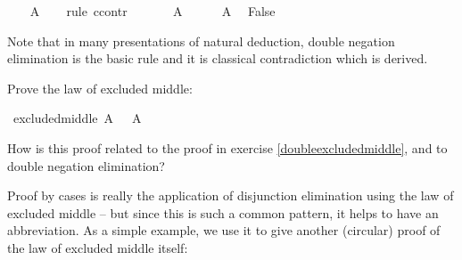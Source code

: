 \begin{isabellebody}
\ \ \isamarkupfalse%
\ {\isachardoublequoteopen}A{\isachardoublequoteclose}\isanewline
\ \ \isamarkupfalse%
\ {\isacharparenleft}rule\ ccontr{\isacharparenright}\isanewline
\ \ \ \ \isamarkupfalse%
\ {\isachardoublequoteopen}{\isasymnot}\ A{\isachardoublequoteclose}\isanewline
\ \ \ \ \isamarkupfalse%
\ {\isacharbackquoteopen}{\isasymnot}{\isasymnot}A{\isacharbackquoteclose}\ \isamarkupfalse%
\ {\isachardoublequoteopen}False{\isachardoublequoteclose}\isacommand{{\isachardot}{\isachardot}}\isamarkupfalse%
\isanewline
\ \ \isamarkupfalse%
\isanewline
{}\isamarkupfalse%
%
\endisatagproof
{\isafoldproof}%
%
\isadelimproof
%
\endisadelimproof
%
\begin{isamarkuptext}%
Note that in many presentations of natural deduction, double negation elimination is the basic
rule and it is classical contradiction which is derived.%
\end{isamarkuptext}\isamarkuptrue%
%
\begin{isamarkuptext}%
\begin{Exercise}[title = The Law of Excluded Middle]\label{excludedmiddle} 
Prove the law of excluded middle: \end{Exercise}%
\end{isamarkuptext}\isamarkuptrue%
\isamarkupfalse%
\ excluded{\isacharunderscore}middle{\isacharcolon}\ {\isachardoublequoteopen}A\ {\isasymor}\ {\isasymnot}\ A{\isachardoublequoteclose}%
\isadelimproof
\ %
\endisadelimproof
%
\isatagproof
{}\isamarkupfalse%
%
\endisatagproof
{\isafoldproof}%
%
\isadelimproof
%
\endisadelimproof
%
\begin{isamarkuptext}%
How is this proof related to the proof in exercise \ref{doubleexcludedmiddle}, and to double negation elimination?%
\end{isamarkuptext}\isamarkuptrue%
%
\isadelimdocument
%
\endisadelimdocument
%
\isatagdocument
%
\isamarkuptrue%
%
\endisatagdocument
{\isafolddocument}%
%
\isadelimdocument
%
\endisadelimdocument
%
\begin{isamarkuptext}%
Proof by cases is really the application of disjunction elimination using the law of excluded
middle -- but since this is such a common pattern, it helps to have an abbreviation. As a simple example,
we use it to give another (circular) proof of the law of excluded middle itself:%
\end{isamarkuptext}\isamarkuptrue%

\end{isabellebody}
